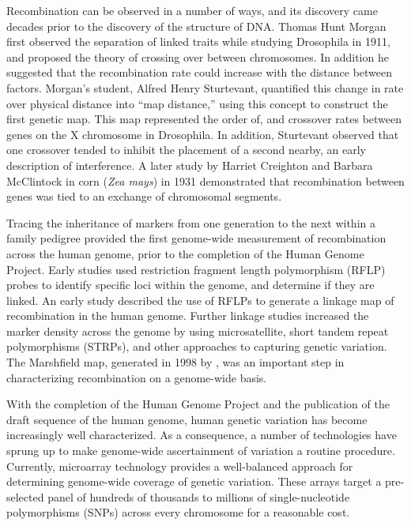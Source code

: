 Recombination can be observed in a number of ways, and its discovery came decades prior to the discovery of the structure of DNA.
Thomas Hunt Morgan first observed the separation of linked traits while studying Drosophila in 1911\cite{Morgan1911}, and proposed the theory of crossing over between chromosomes.
In addition he suggested that the recombination rate could increase with the distance between factors.
Morgan's student, Alfred Henry Sturtevant, quantified this change in rate over physical distance into ``map distance,'' using this concept to construct the first genetic map.
This map represented the order of, and crossover rates between genes on the X chromosome in Drosophila\cite{Sturtevant1913}.
In addition, Sturtevant observed that one crossover tended to inhibit the placement of a second nearby, an early description of interference.
A later study by Harriet Creighton and Barbara McClintock in corn (\textit{Zea mays}) in 1931 demonstrated that recombination between genes was tied to an exchange of chromosomal segments\cite{Creighton1931}.

Tracing the inheritance of markers from one generation to the next within a family pedigree provided the first genome-wide measurement of recombination across the human genome, prior to the completion of the Human Genome Project.
Early studies used restriction fragment length polymorphism (RFLP) probes to identify specific loci within the genome, and determine if they are linked.
An early study described the use of RFLPs to generate a linkage map of recombination in the human genome\cite{Botstein1980}.
Further linkage studies increased the marker density across the genome by using microsatellite, short tandem repeat polymorphisms (STRPs), and other approaches to capturing genetic variation\cite{Morton1991,Matise1994,Dib1996}.
The Marshfield map, generated in 1998 by \citet{Broman1998}, was an important step in characterizing recombination on a genome-wide basis.

With the completion of the Human Genome Project and the publication of the draft sequence of the human genome\cite{Venter2001,Lander2001}, human genetic variation has become increasingly well characterized.
As a consequence, a number of technologies have sprung up to make genome-wide ascertainment of variation a routine procedure.
Currently, microarray technology provides a well-balanced approach for determining genome-wide coverage of genetic variation.
These arrays target a pre-selected panel of hundreds of thousands to millions of single-nucleotide polymorphisms (SNPs) across every chromosome for a reasonable cost.

